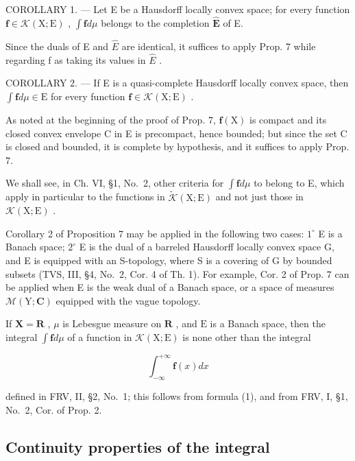 COROLLARY 1. --- Let E be a Hausdorff locally convex space; for every function \(\mathbf{f} \in \mathcal{K}(\mathrm{X};\mathrm{E})\) , \(\int \mathbf{f} d\mu\) belongs to the completion \(\widehat{\mathbf{E}}\) of E.

Since the duals of E and \(\widehat{E}\) are identical, it suffices to apply Prop. 7 while regarding f as taking its values in \(\widehat{E}\) .

COROLLARY 2. --- If E is a quasi-complete Hausdorff locally convex space, then \(\int \mathbf{f} d\mu \in \mathrm{E}\) for every function \(\mathbf{f} \in \mathcal{K}(\mathrm{X};\mathrm{E})\) .

As noted at the beginning of the proof of Prop. 7, \(\mathbf{f}(\mathrm{X})\) is compact and its closed convex envelope C in E is precompact, hence bounded; but since the set C is closed and bounded, it is complete by hypothesis, and it suffices to apply Prop. 7.

We shall see, in Ch. VI, §1, No.~2, other criteria for \(\int \mathbf{f} d\mu\) to belong to E, which apply in particular to the functions in \(\widetilde{\mathcal{K}}(\mathrm{X};\mathrm{E})\) and not just those in \(\mathcal{K}(\mathrm{X};\mathrm{E})\) .

Corollary 2 of Proposition 7 may be applied in the following two cases: \(1^{\circ}\) E is a Banach space; \(2^{\circ}\) E is the dual of a barreled Hausdorff locally convex space G, and E is equipped with an S-topology, where S is a covering of G by bounded subsets (TVS, III, §4, No.~2, Cor. 4 of Th. 1). For example, Cor. 2 of Prop. 7 can be applied when E is the weak dual of a Banach space, or a space of measures \(\mathcal{M}(\mathrm{Y};\mathbf{C})\) equipped with the vague topology.

If \(\mathbf{X} = \mathbf{R}\) , \(\mu\) is Lebesgue measure on \(\mathbf{R}\) , and \(\mathrm{E}\) is a Banach space, then the integral \(\int \mathbf{f} d\mu\) of a function in \(\mathcal{K}(\mathrm{X};\mathrm{E})\) is none other than the integral

\[
\int_ {- \infty} ^ {+ \infty} \mathbf {f} (x) d x
\]

defined in FRV, II, §2, No.~1; this follows from formula (1), and from FRV, I, §1, No.~2, Cor. of Prop. 2.

\subsection{Continuity properties of the integral}

